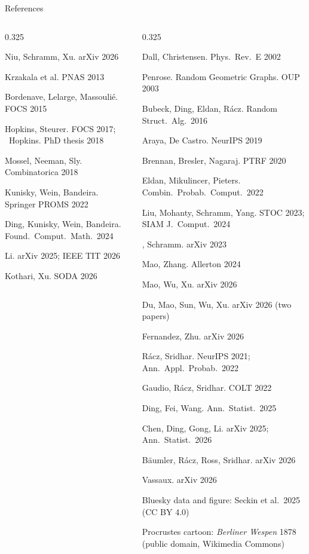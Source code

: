 \documentclass[aspectratio=169,10pt]{beamer}
\newcommand{\rh}[1]{\par\vspace{1.2mm}{\scriptsize\bfseries #1\par}\vspace{0.4mm}}
\newcommand{\rr}[1]{{\tiny #1\par}}
\begin{document}
\begin{frame}{References}
\begin{columns}[T,onlytextwidth]
\begin{column}{0.325\textwidth}
\rr{Niu, Schramm, Xu. arXiv 2026}
\rh{\textcolor{titleblue}{Spectral methods, low degree}}
\rr{Krzakala et al. PNAS 2013}
\rr{Bordenave, Lelarge, Massoulié. FOCS 2015}
\rr{Hopkins, Steurer. FOCS 2017; \ Hopkins. PhD thesis 2018}
\rr{Mossel, Neeman, Sly. Combinatorica 2018}
\rr{Kunisky, Wein, Bandeira. Springer PROMS 2022}
\rr{Ding, Kunisky, Wein, Bandeira. Found.\ Comput.\ Math.\ 2024}
\rr{Li. arXiv 2025; IEEE TIT 2026}
\rr{Kothari, Xu. SODA 2026}
\end{column}
\begin{column}{0.325\textwidth}
\rh{\textcolor{titleblue}{Random geometric graphs}}
\rr{Dall, Christensen. Phys.\ Rev.\ E 2002}
\rr{Penrose. Random Geometric Graphs. OUP 2003}
\rr{Bubeck, Ding, Eldan, Rácz. Random Struct.\ Alg.\ 2016}
\rr{Araya, De Castro. NeurIPS 2019}
\rr{Brennan, Bresler, Nagaraj. PTRF 2020}
\rr{Eldan, Mikulincer, Pieters. Combin.\ Probab.\ Comput.\ 2022}
\rr{Liu, Mohanty, Schramm, Yang. STOC 2023; SIAM J.\ Comput.\ 2024}
\rr{\me, Schramm. arXiv 2023}
\rr{Mao, Zhang. Allerton 2024}
\rr{Mao, Wu, Xu. arXiv 2026}
\rr{Du, Mao, Sun, Wu, Xu. arXiv 2026 (two papers)}
\rr{Fernandez, Zhu. arXiv 2026}
\rh{\textcolor{titleblue}{Matching beyond correlated \ER}}
\rr{Rácz, Sridhar. NeurIPS 2021; Ann.\ Appl.\ Probab.\ 2022}
\rr{Gaudio, Rácz, Sridhar. COLT 2022}
\rr{Ding, Fei, Wang. Ann.\ Statist.\ 2025}
\rr{Chen, Ding, Gong, Li. arXiv 2025; Ann.\ Statist.\ 2026}
\rr{Bäumler, Rácz, Ross, Sridhar. arXiv 2026}
\rr{Vassaux. arXiv 2026}
\rh{\textcolor{titleblue}{Images}}
\rr{Bluesky data and figure: Seckin et al.\ 2025 (CC BY 4.0)}
\rr{Procrustes cartoon: \emph{Berliner Wespen} 1878 (public domain, Wikimedia Commons)}
\end{column}
\end{columns}
\end{frame}
\end{document}
